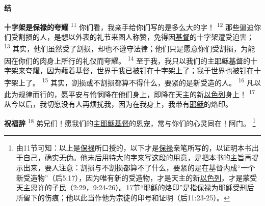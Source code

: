 \begin{center}
	\textbf{\large{\songti 结}}
\end{center}

\textbf{十字架是保禄的夸耀\quad}
\textsuperscript{11}
你们看，我亲手给你们写的是多么大的字！
\textsuperscript{12}
那些逼迫你们受割损的人，是想以外表的礼节来图人称赞，免得因\uline{基督}的十字架遭受迫害；
\textsuperscript{13}
其实，他们虽然受了割损，却也不遵守法律；他们只是愿意你们受割损，为能因在你们的肉身上所行的礼仪而夸耀。
\textsuperscript{14}
至于我，我只以我们的主\uline{耶稣}\uline{基督}的十字架来夸耀，因为藉着\uline{基督}，世界于我已被钉在十字架上了；我于世界也被钉在十字架上了。
\textsuperscript{15}
其实，割损或不割损都算不得什么，要紧的是新受造的人。
\textsuperscript{16}
凡以此为规律而行的，愿平安与怜悯降在他们身上，即降在天主的新\uline{以色列}身上！
\textsuperscript{17}
从今以后，我切愿没有人再烦扰我，因为在我身上，我带有\uline{耶稣}的烙印。

\textbf{祝福辞\quad}
\textsuperscript{18}
弟兄们！愿我们的主\uline{耶稣}\uline{基督}的恩宠，常与你们的心灵同在！阿门。
\footnote{由11节可知：以上是\uline{保禄}所口授的，以下才是\uline{保禄}亲笔所写的，以证明本书出于自己，确实无伪。他末后用特大的字来写这段的用意，是把本书的主旨再提示出来，要人注意：割损与不割损都算不了什么，要紧的是在基督内成“一个新受造物”（后5:17），因为唯有新的受造物，才是天主的新\uline{以色列}，才是蒙受天主恩许的子民（2:29，9:24-26）。17节“\uline{耶稣}的烙印”是指\uline{保禄}为\uline{耶稣}受刑后所留下的伤痕；他以此当作他为宗徒的印号和证明（后11:23-25）。}